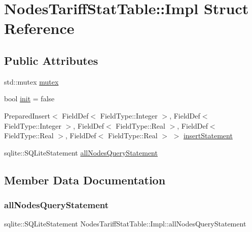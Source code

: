 \hypertarget{struct_nodes_tariff_stat_table_1_1_impl}{}\section{Nodes\+Tariff\+Stat\+Table\+::Impl Struct Reference}
\label{struct_nodes_tariff_stat_table_1_1_impl}
\subsection*{Public Attributes}
\begin{DoxyCompactItemize}
\item 
std\+::mutex \mbox{\hyperlink{struct_nodes_tariff_stat_table_1_1_impl_ad1d001d2359640345238ff5dab04d127}{mutex}}
\item 
bool \mbox{\hyperlink{struct_nodes_tariff_stat_table_1_1_impl_afec85299c0bb3976803ae64f3d51f90f}{init}} = false
\item 
Prepared\+Insert$<$ Field\+Def$<$ Field\+Type\+::\+Integer $>$, Field\+Def$<$ Field\+Type\+::\+Integer $>$, Field\+Def$<$ Field\+Type\+::\+Real $>$, Field\+Def$<$ Field\+Type\+::\+Real $>$, Field\+Def$<$ Field\+Type\+::\+Real $>$ $>$ \mbox{\hyperlink{struct_nodes_tariff_stat_table_1_1_impl_a799754ca1a2c59f9c7bf8787a80efb29}{insert\+Statement}}
\item 
sqlite\+::\+S\+Q\+Lite\+Statement \mbox{\hyperlink{struct_nodes_tariff_stat_table_1_1_impl_ac81cec7aa201ec8a16aa0e8dcf2e1042}{all\+Nodes\+Query\+Statement}}
\end{DoxyCompactItemize}


\subsection{Member Data Documentation}
\mbox{\label{struct_nodes_tariff_stat_table_1_1_impl_ac81cec7aa201ec8a16aa0e8dcf2e1042}} 
\subsubsection{\texorpdfstring{allNodesQueryStatement}{allNodesQueryStatement}}
{\footnotesize\ttfamily sqlite\+::\+S\+Q\+Lite\+Statement Nodes\+Tariff\+Stat\+Table\+::\+Impl\+::all\+Nodes\+Query\+Statement}

